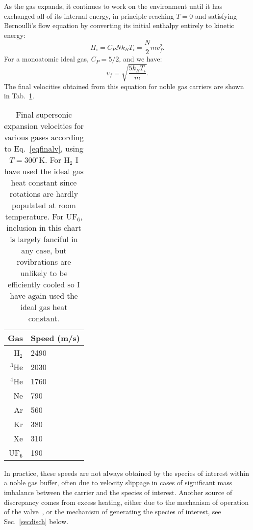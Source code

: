 As the gas expands, it continues to work on the environment until it has exchanged all of its internal energy, in principle reaching $T=0$ and satisfying Bernoulli's flow equation by converting its initial enthalpy entirely to kinetic energy:
\begin{equation}
H_i = C_PNk_BT_i = \frac{N}{2}mv_f^2.
\end{equation}
For a monoatomic ideal gas, $C_P = 5/2$, and we have:
\begin{equation}
v_f = \sqrt{\frac{5k_BT_i}{m}}.\label{eqfinalv}
\end{equation}
The final velocities obtained from this equation for noble gas carriers are shown in Tab.~\ref{tabfinal}.
\begin{table}[t!]
\centering
\caption[Final Supersonic Expansion Velocities]{Final supersonic expansion velocities for various gases according to Eq.~\ref{eqfinalv}, using $T=300^\circ$K. For H$_2$ I have used the ideal gas heat constant since rotations are hardly populated at room temperature. For UF$_6$, inclusion in this chart is largely fanciful in any case, but rovibrations are unlikely to be efficiently cooled so I have again used the ideal gas heat constant.\label{tabfinal}}
\begin{tabular}{r|l}
Gas & Speed (m/s)\\
\hline
H$_2$ & 2490\\
$^3$He & 2030 \\
$^4$He & 1760 \\
Ne & 790 \\
Ar & 560 \\
Kr & 380 \\
Xe & 310 \\
UF$_6$ & 190
\end{tabular}
\end{table}
In practice, these speeds are not always obtained by the species of interest within a noble gas buffer, often due to velocity slippage in cases of significant mass imbalance between the carrier and the species of interest.
Another source of discrepancy comes from excess heating, either due to the mechanism of operation of the valve~\citep[Sec.~3.1.3.1]{SawyerThesis2010}, or the mechanism of generating the species of interest, see Sec.~\ref{secdisch} below.

